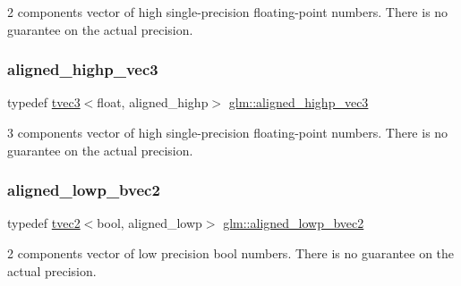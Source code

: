 2 components vector of high single-\/precision floating-\/point numbers. There is no guarantee on the actual precision. \mbox{\label{group__gtc__type__aligned_ga69a63faccd6a139ff97748c81a603d50}} 
\subsubsection{\texorpdfstring{aligned\+\_\+highp\+\_\+vec3}{aligned\_highp\_vec3}}
{\footnotesize\ttfamily typedef \hyperlink{structglm_1_1tvec3}{tvec3}$<$float, aligned\+\_\+highp$>$ \hyperlink{group__gtc__type__aligned_ga69a63faccd6a139ff97748c81a603d50}{glm\+::aligned\+\_\+highp\+\_\+vec3}}

3 components vector of high single-\/precision floating-\/point numbers. There is no guarantee on the actual precision. \mbox{\label{group__gtc__type__aligned_gab9dc3bd3ccc5a3a8c30a4bd4b6927782}} 
\subsubsection{\texorpdfstring{aligned\+\_\+lowp\+\_\+bvec2}{aligned\_lowp\_bvec2}}
{\footnotesize\ttfamily typedef \hyperlink{structglm_1_1tvec2}{tvec2}$<$bool, aligned\+\_\+lowp$>$ \hyperlink{group__gtc__type__aligned_gab9dc3bd3ccc5a3a8c30a4bd4b6927782}{glm\+::aligned\+\_\+lowp\+\_\+bvec2}}

2 components vector of low precision bool numbers. There is no guarantee on the actual precision. \mbox{\label{group__gtc__type__aligned_ga34c204b5e816428a4ad5b0489fe8aa48}} 
